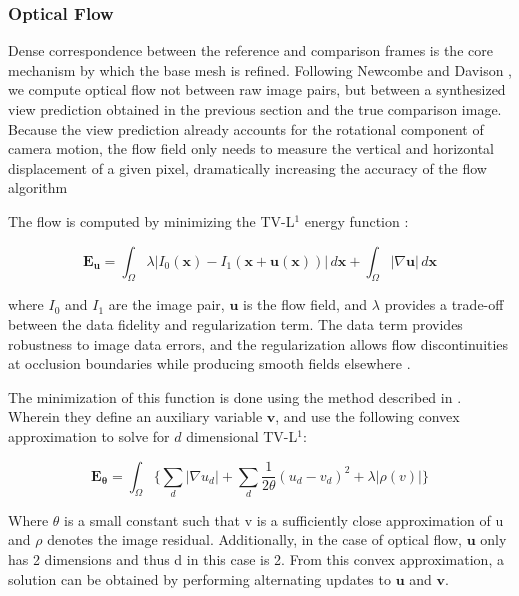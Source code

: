 \documentclass[10pt,twocolumn]{article}
\begin{document}
\subsubsection{Optical Flow}

Dense correspondence between the reference and comparison frames is the core mechanism by which the base mesh is refined. Following Newcombe and Davison \cite{newcombe2010}, we compute optical flow not between raw image pairs, but between a synthesized view prediction obtained in the previous section and the true comparison image. Because the view prediction already accounts for the rotational component of camera motion, the flow field only needs to measure the vertical and horizontal displacement of a given pixel, dramatically increasing the accuracy of the flow algorithm

The flow is computed by minimizing the TV-L$^1$ energy function \cite{wedel2009}:

\begin{equation}
    \mathbf{E_u} = \int_\Omega \lambda |I_0(\mathbf{x}) - I_1(\mathbf{x} + \mathbf{u}(\mathbf{x}))| \, d\mathbf{x} + \int_\Omega |\nabla \mathbf{u}| \, d\mathbf{x}
\end{equation}

where $I_0$ and $I_1$ are the image pair, $\mathbf{u}$ is the flow field, and $\lambda$ provides a trade-off between the data fidelity and regularization term. The data term provides robustness to image data errors, and the regularization allows flow discontinuities at occlusion boundaries while producing smooth fields elsewhere \cite{newcombe2010}.


The minimization of this function is done using the method described in \cite{wedel2009}. Wherein they define an auxiliary variable $\mathbf{v}$, and use the following convex approximation to solve for \(d\) dimensional TV-L$^1$:

\begin{equation}
\mathbf{E_\theta}=\int_\Omega \{\sum_d |\nabla u_d|+\sum_d\frac{1}{2\theta}(u_d-v_d)^2+\lambda|\rho(v)| \}
\end{equation}

Where \(\theta\) is a small constant such that v is a sufficiently close approximation of u and \(\rho\) denotes the image residual. Additionally, in the case of optical flow, $\mathbf{u}$ only has 2 dimensions and thus d in this case is 2. From this convex approximation, a solution can be obtained by performing alternating updates to $\mathbf{u}$ and $\mathbf{v}$.
\end{document}
